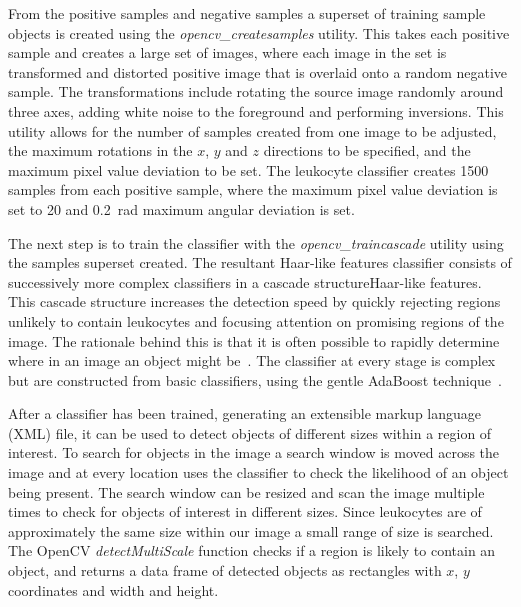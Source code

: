 From the positive samples and negative samples a superset of training sample objects is created using the \emph{opencv\_createsamples} utility. This takes each positive sample and creates a large set of images, where each image in the set is transformed and distorted positive image that is overlaid onto a random negative sample. The transformations include rotating the source image randomly around three axes, adding white noise to the foreground and performing inversions. This utility allows for the number of samples created from one image to be adjusted, the maximum rotations in the $x$, $y$ and $z$ directions to be specified, and the maximum pixel value deviation to be set. The leukocyte classifier creates 1500 samples from each positive sample, where the maximum pixel value deviation is set to 20 and \SI{0.2}{\radian} maximum angular deviation is set.

The next step is to train the classifier with the \emph{opencv\_traincascade} utility using the samples superset created. The resultant Haar-like features classifier consists of successively more complex classifiers in a cascade structureHaar-like features. This cascade structure increases the detection speed by quickly rejecting regions unlikely to contain leukocytes and focusing attention on promising regions of the image. The rationale behind this is that it is often possible to rapidly determine where in an image an object might be~\cite{Itti1998}. The classifier at every stage is complex but are constructed from basic classifiers, using the gentle AdaBoost technique~\cite{Friedman2000}.

After a classifier has been trained, generating an extensible markup language (XML) file, it can be used to detect objects of different sizes within a region of interest. To search for objects in the image a search window is moved across the image and at every location uses the classifier to check the likelihood of an object being present. The search window can be resized and scan the image multiple times to check for objects of interest in different sizes. Since leukocytes are of approximately the same size within our image a small range of size is searched. The OpenCV \emph{detectMultiScale} function checks if a region is likely to contain an object, and returns a data frame of detected objects as rectangles with $x$, $y$ coordinates and width and height.

